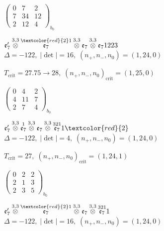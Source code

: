 \documentclass[10pt]{article}
\begin{document}
\hspace{2em}$\left(\begin{smallmatrix}0 & 7 & 2 \\ 7 & 34 & 12 \\ 2 & 12 & 4\end{smallmatrix}\right)_{\!b_0}$

\smallskip

$\mathfrak{e}_7'\overset{3,3}{\otimes}\overset{\textcolor{red}{2}1}{\mathfrak{e}_7}\overset{3,3}{\otimes}\mathfrak{e}_7\overset{3,3}{\otimes}\mathfrak{e}_71223$ \quad $\Delta=-122,\; |\det|=16,\; (n_+,n_-,n_0)=(1,24,0)$

\hspace{1em}$T_{\text{crit}}=27.75 \to 28,\; (n_+,n_-,n_0)_{\text{crit}}=(1,25,0)$

\hspace{2em}$\left(\begin{smallmatrix}0 & 4 & 2 \\ 4 & 11 & 7 \\ 2 & 7 & 4\end{smallmatrix}\right)_{\!b_0}$

\smallskip

$\mathfrak{e}_7'\overset{3,3}{\otimes}\overset{1}{\mathfrak{e}_7}\overset{3,3}{\otimes}\mathfrak{e}_7\overset{3,3}{\otimes}\overset{321}{\mathfrak{e}_7}1\textcolor{red}{2}$ \quad $\Delta=-122,\; |\det|=4,\; (n_+,n_-,n_0)=(1,24,0)$

\hspace{1em}$T_{\text{crit}}=27,\; (n_+,n_-,n_0)_{\text{crit}}=(1,24,1)$

\hspace{2em}$\left(\begin{smallmatrix}0 & 2 & 2 \\ 2 & 1 & 3 \\ 2 & 3 & 5\end{smallmatrix}\right)_{\!b_0}$

$\mathfrak{e}_7'\overset{3,3}{\otimes}\overset{\textcolor{red}{2}1}{\mathfrak{e}_7}\overset{3,3}{\otimes}\mathfrak{e}_7\overset{3,3}{\otimes}\overset{321}{\mathfrak{e}_7}1$ \quad $\Delta=-122,\; |\det|=16,\; (n_+,n_-,n_0)=(1,24,0)$
\end{document}
